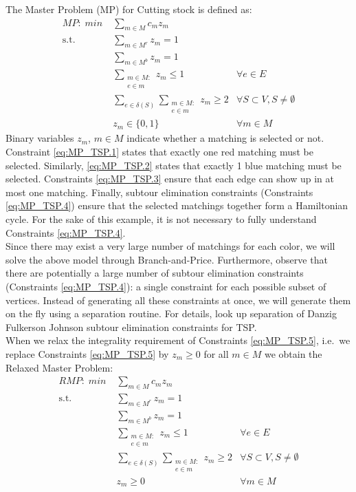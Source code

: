 \documentclass[a4paper]{article}
\begin{document}
The Master Problem (MP) for Cutting stock is defined as:
\begin{align}
\label{eq:MP_TSP.0} \mathit{MP:}\; min\; &\sum_{m\in M} c_mz_m &\\
\label{eq:MP_TSP.1} \mbox{s.t. }&\sum_{m \in M^r} z_m = 1 & \\
\label{eq:MP_TSP.2} &\sum_{m \in M^b} z_m = 1 & \\
\label{eq:MP_TSP.3} &\sum_{\substack{m \in M:\\e\in m}} z_m \leq 1 & \forall e\in E\\
\label{eq:MP_TSP.4} &\sum_{e\in \delta(S)}\sum_{\substack{m \in M:\\e\in m}} z_m \geq 2 & \forall S\subset V, S\neq \emptyset\\
\label{eq:MP_TSP.5} &z_m\in \{0,1\} &\forall m\in M
\end{align}
Binary variables $z_m$, $m\in M$ indicate whether a matching is selected or not. Constraint \eqref{eq:MP_TSP.1} states that exactly one red matching must be selected. Similarly, \eqref{eq:MP_TSP.2} states that exactly 1 blue matching must be selected. Constraints \eqref{eq:MP_TSP.3} ensure that each edge can show up in at most one matching. Finally, subtour elimination constraints (Constraints \eqref{eq:MP_TSP.4}) ensure that the selected matchings together form a Hamiltonian cycle. For the sake of this example, it is not necessary to fully understand Constraints \eqref{eq:MP_TSP.4}.\\
Since there may exist a very large number of matchings for each color, we will solve the above model through Branch-and-Price. Furthermore, observe that there are potentially a large number of subtour elimination constraints (Constraints \eqref{eq:MP_TSP.4}): a single constraint for each possible subset of vertices. Instead of generating all these constraints at once, we will generate them on the fly using a separation routine. For details, look up separation of Danzig Fulkerson Johnson subtour elimination constraints for TSP.\\
When we relax the integrality requirement of Constraints \eqref{eq:MP_TSP.5}, i.e.\ we replace Constraints \eqref{eq:MP_TSP.5} by $z_m\geq 0$ for all $m\in M$ we obtain the Relaxed Master Problem:
\begin{align}
\label{eq:MP_TSP.6} \mathit{RMP:}\; min\; &\sum_{m\in M} c_mz_m &\\
\label{eq:MP_TSP.7} \mbox{s.t. }&\sum_{m \in M^r} z_m = 1 & \\
\label{eq:MP_TSP.8} &\sum_{m \in M^b} z_m = 1 & \\
\label{eq:MP_TSP.9} &\sum_{\substack{m \in M:\\e\in m}} z_m \leq 1 & \forall e\in E\\
\label{eq:MP_TSP.10} &\sum_{e\in \delta(S)}\sum_{\substack{m \in M:\\e\in m}} z_m \geq 2 & \forall S\subset V, S\neq \emptyset\\
\label{eq:MP_TSP.11} &z_m\geq 0 &\forall m\in M
\end{align}
\end{document}
